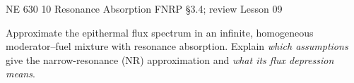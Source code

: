 %

\providecommand{\dd}{\,\mathrm{d}}
\usetikzlibrary{arrows.meta}
\setlength{\abovedisplayskip}{4pt plus 1pt minus 1pt}
\setlength{\belowdisplayskip}{4pt plus 1pt minus 1pt}
\setlength{\abovedisplayshortskip}{3pt plus 1pt}
\setlength{\belowdisplayshortskip}{3pt plus 1pt}
\setlength{\jot}{2pt}

\HandoutSetup
  {NE 630}
  {10}
  {Resonance Absorption}
  {FNRP \S3.4; review Lesson 09}


\MakeHandoutTitle
\begin{takeawaybox}
Approximate the epithermal flux spectrum in an infinite, homogeneous moderator--fuel mixture with resonance absorption. Explain \emph{which assumptions} give the narrow-resonance (NR) approximation and \emph{what its flux depression means}.
\end{takeawaybox}

